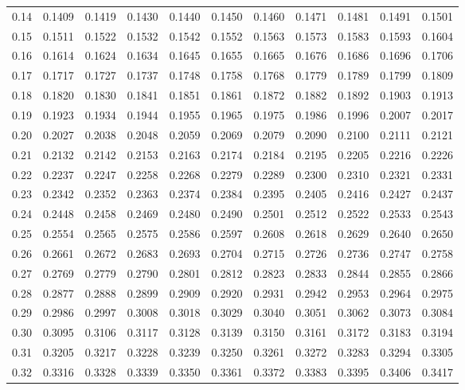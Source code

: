 \begin{center}
\begin{tabular}{r*{10}{r}}
		0.14 & 0.1409 & 0.1419 & 0.1430 & 0.1440 & 0.1450 & 0.1460 & 0.1471 & 0.1481 & 0.1491 & 0.1501 \\
		0.15 & 0.1511 & 0.1522 & 0.1532 & 0.1542 & 0.1552 & 0.1563 & 0.1573 & 0.1583 & 0.1593 & 0.1604 \\
		0.16 & 0.1614 & 0.1624 & 0.1634 & 0.1645 & 0.1655 & 0.1665 & 0.1676 & 0.1686 & 0.1696 & 0.1706 \\
		0.17 & 0.1717 & 0.1727 & 0.1737 & 0.1748 & 0.1758 & 0.1768 & 0.1779 & 0.1789 & 0.1799 & 0.1809 \\
		0.18 & 0.1820 & 0.1830 & 0.1841 & 0.1851 & 0.1861 & 0.1872 & 0.1882 & 0.1892 & 0.1903 & 0.1913 \\
		0.19 & 0.1923 & 0.1934 & 0.1944 & 0.1955 & 0.1965 & 0.1975 & 0.1986 & 0.1996 & 0.2007 & 0.2017 \\[5pt]
		0.20 & 0.2027 & 0.2038 & 0.2048 & 0.2059 & 0.2069 & 0.2079 & 0.2090 & 0.2100 & 0.2111 & 0.2121 \\
		0.21 & 0.2132 & 0.2142 & 0.2153 & 0.2163 & 0.2174 & 0.2184 & 0.2195 & 0.2205 & 0.2216 & 0.2226 \\
		0.22 & 0.2237 & 0.2247 & 0.2258 & 0.2268 & 0.2279 & 0.2289 & 0.2300 & 0.2310 & 0.2321 & 0.2331 \\
		0.23 & 0.2342 & 0.2352 & 0.2363 & 0.2374 & 0.2384 & 0.2395 & 0.2405 & 0.2416 & 0.2427 & 0.2437 \\
		0.24 & 0.2448 & 0.2458 & 0.2469 & 0.2480 & 0.2490 & 0.2501 & 0.2512 & 0.2522 & 0.2533 & 0.2543 \\
		0.25 & 0.2554 & 0.2565 & 0.2575 & 0.2586 & 0.2597 & 0.2608 & 0.2618 & 0.2629 & 0.2640 & 0.2650 \\
		0.26 & 0.2661 & 0.2672 & 0.2683 & 0.2693 & 0.2704 & 0.2715 & 0.2726 & 0.2736 & 0.2747 & 0.2758 \\
		0.27 & 0.2769 & 0.2779 & 0.2790 & 0.2801 & 0.2812 & 0.2823 & 0.2833 & 0.2844 & 0.2855 & 0.2866 \\
		0.28 & 0.2877 & 0.2888 & 0.2899 & 0.2909 & 0.2920 & 0.2931 & 0.2942 & 0.2953 & 0.2964 & 0.2975 \\
		0.29 & 0.2986 & 0.2997 & 0.3008 & 0.3018 & 0.3029 & 0.3040 & 0.3051 & 0.3062 & 0.3073 & 0.3084 \\[5pt]
		0.30 & 0.3095 & 0.3106 & 0.3117 & 0.3128 & 0.3139 & 0.3150 & 0.3161 & 0.3172 & 0.3183 & 0.3194 \\
		0.31 & 0.3205 & 0.3217 & 0.3228 & 0.3239 & 0.3250 & 0.3261 & 0.3272 & 0.3283 & 0.3294 & 0.3305 \\
		0.32 & 0.3316 & 0.3328 & 0.3339 & 0.3350 & 0.3361 & 0.3372 & 0.3383 & 0.3395 & 0.3406 & 0.3417 \\

\end{tabular}
\end{center}
